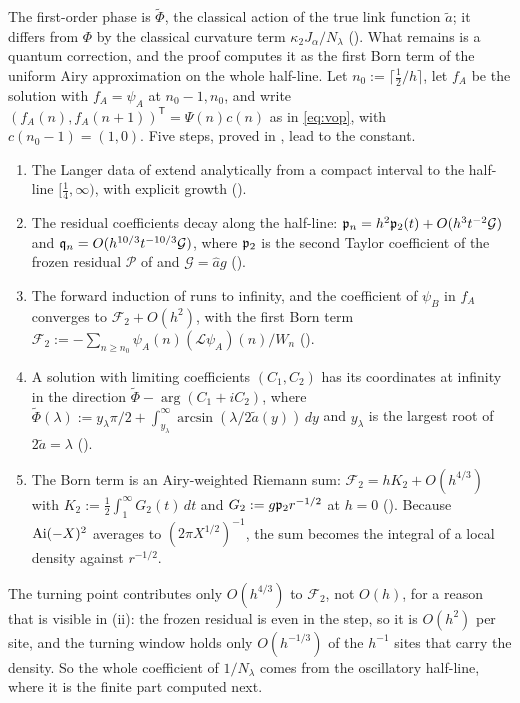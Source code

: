 The first-order phase is $\tilde\Phi$, the classical action of the true link function $\tilde a$; it
differs from $\Phi$ by the classical curvature term $\kappa_2J_\alpha/N_\lambda$ (). What
remains is a quantum correction, and the proof computes it as the first Born term of the uniform
Airy approximation on the whole half-line. Let $n_0:=\lceil\frac12/h\rceil$, let $f_A$ be the solution
with $f_A=\psi_A$ at $n_0-1,n_0$, and write $(f_A(n),f_A(n+1))^{\mathsf T}=\Psi(n)c(n)$ as in
\eqref{eq:vop}, with $c(n_0-1)=(1,0)$. Five steps, proved in , lead to the constant.
\begin{enumerate}
\item[(i)] The Langer data of  extend analytically from a compact interval to the
  half-line $[\frac14,\infty)$, with explicit growth ().
\item[(ii)] The residual coefficients decay along the half-line: $\mathfrak{p}_n=h^2\mathfrak{p}_2(t)+O(h^3t^{-2}\mathcal G)$
  and $\mathfrak{q}_n=O(h^{10/3}t^{-10/3}\mathcal G)$, where $\mathfrak{p}_2$ is the second Taylor coefficient of the frozen
  residual $\mathcal P$ of  and $\mathcal G=\hat ag$ ().
\item[(iii)] The forward induction of  runs to infinity, and the coefficient of
  $\psi_B$ in $f_A$ converges to $\mathcal F_2+O(h^2)$, with the first Born term
  $\mathcal F_2:=-\sum_{n\ge n_0}\psi_A(n)(\mathcal L\psi_A)(n)/W_n$ ().
\item[(iv)] A solution with limiting coefficients $(C_1,C_2)$ has its coordinates at infinity in the
  direction $\tilde\Phi-\arg(C_1+iC_2)$, where
  $\tilde\Phi(\lambda):=y_\lambda\pi/2+\int_{y_\lambda}^\infty\arcsin(\lambda/2\tilde a(y))\,dy$ and $y_\lambda$ is the largest
  root of $2\tilde a=\lambda$ ().
\item[(v)] The Born term is an Airy-weighted Riemann sum: $\mathcal F_2=hK_2+O(h^{4/3})$ with
  $K_2:=\frac12\int_1^\infty G_2(t)\,dt$ and $G_2:=g\mathfrak{p}_2r^{-1/2}$ at $h=0$ (). Because
  $\operatorname{Ai}(-X)^2$ averages to $(2\pi X^{1/2})^{-1}$, the sum becomes the integral of a local density
  against $r^{-1/2}$.
\end{enumerate}
The turning point contributes only $O(h^{4/3})$ to $\mathcal F_2$, not $O(h)$, for a reason that is
visible in (ii): the frozen residual is even in the step, so it is $O(h^2)$ per site, and the turning
window holds only $O(h^{-1/3})$ of the $h^{-1}$ sites that carry the density. So the whole coefficient of
$1/N_\lambda$ comes from the oscillatory half-line, where it is the finite part computed next.

